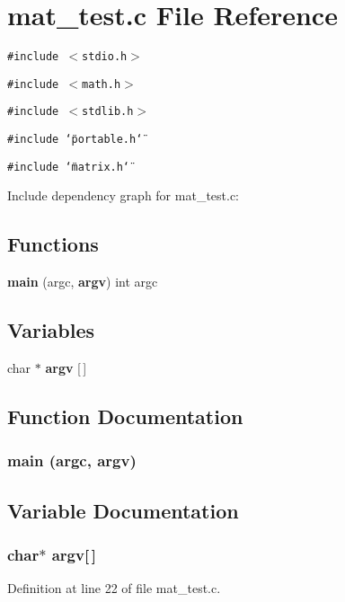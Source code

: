 \section{mat\_\-test.c File Reference}
\label{mat__test_8c}
{\tt \#include $<$stdio.h$>$}\par
{\tt \#include $<$math.h$>$}\par
{\tt \#include $<$stdlib.h$>$}\par
{\tt \#include \char`\"{}portable.h\char`\"{}}\par
{\tt \#include \char`\"{}matrix.h\char`\"{}}\par


Include dependency graph for mat\_\-test.c:\subsection*{Functions}
\begin{CompactItemize}
\item 
{\bf main} (argc, {\bf argv}) int argc
\end{CompactItemize}
\subsection*{Variables}
\begin{CompactItemize}
\item 
char $\ast$ {\bf argv} [$\,$]
\end{CompactItemize}


\subsection{Function Documentation}
\subsubsection{\setlength{\rightskip}{0pt plus 5cm}main (argc, {\bf argv})}\label{mat__test_8c_a1}




\subsection{Variable Documentation}
\subsubsection{\setlength{\rightskip}{0pt plus 5cm}char$\ast$ argv[$\,$]}\label{mat__test_8c_a0}




Definition at line 22 of file mat\_\-test.c.